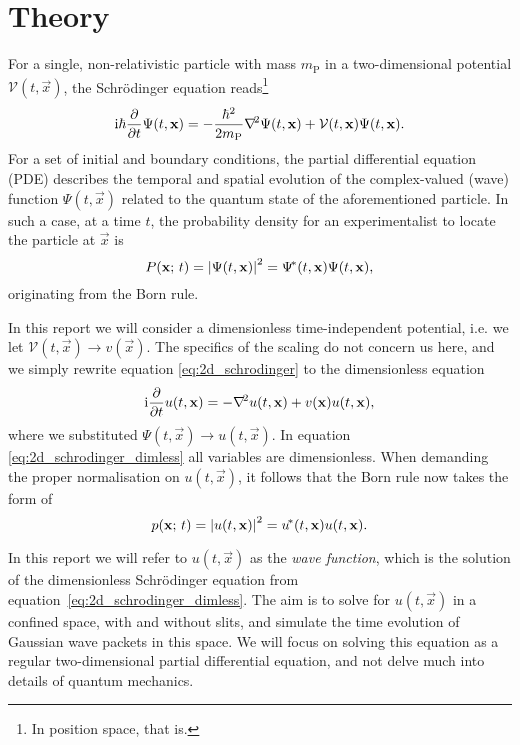 
\section{Theory}\label{sec:theory}
    For a single, non-relativistic particle with mass $m_\mathrm{P}$ in a two-dimensional potential $\mathcal{V}(t, \vec{x})$, the Schrödinger equation reads\footnote{In position space, that is.}
    \begin{equation}\label{eq:2d_schrodinger}
        \mathrm{i} \hbar \pdv{}{t}\Psi(t, \mathbf{x}) = -\frac{\hbar^2}{2m_\mathrm{P}}\nabla^{\!2} \Psi(t, \mathbf{x})  + \mathcal{V}(t, \mathbf{x}) \Psi(t, \mathbf{x}).
    \end{equation}
    For a set of initial and boundary conditions, the partial differential equation (PDE) describes the temporal and spatial evolution of the complex-valued (wave) function $\Psi(t, \vec{x})$ related to the quantum state of the aforementioned particle. In such a case, at a time $t$, the probability density for an experimentalist to locate the particle at $\vec{x}$ is
    \begin{equation}\label{eq:2d_bornrule}
        P(\mathbf{x}; \, t) = \abs{\Psi(t, \mathbf{x})}^2 = \Psi^{\!*}(t, \mathbf{x}) \Psi(t, \mathbf{x}),
    \end{equation} 
    originating from the Born rule.

    In this report we will consider a dimensionless time-independent potential, i.e. we let $\mathcal{V}(t, \vec{x}) \to v(\vec{x})$. The specifics of the scaling do not concern us here, and we simply rewrite equation \eqref{eq:2d_schrodinger} to the dimensionless equation
    \begin{equation}\label{eq:2d_schrodinger_dimless}
        \mathrm{i} \pdv{}{t}u(t, \mathbf{x}) = - \nabla^{\!2}u(t, \mathbf{x})+ v(\mathbf{x})u(t, \mathbf{x}),
    \end{equation}
    where we substituted $\Psi(t, \vec{x}) \to u(t, \vec{x})$. In equation \eqref{eq:2d_schrodinger_dimless} all variables are dimensionless. When demanding the proper normalisation on $u(t,\vec{x})$, it follows that the Born rule now takes the form of
    \begin{equation}\label{eq:2d_bornrule_dimless}
        p(\mathbf{x}; \, t) = \abs{u(t, \mathbf{x})}^2 = u^{\!*} (t, \mathbf{x})u(t, \mathbf{x}).
    \end{equation}

    In this report we will refer to $u(t, \vec{x})$ as the \textit{wave function}, which is the solution of the dimensionless Schrödinger equation from equation~\eqref{eq:2d_schrodinger_dimless}. The aim is to solve for $u(t,\vec{x})$ in a confined space, with and without slits, and simulate the time evolution of Gaussian wave packets in this space. We will focus on solving this equation as a regular two-dimensional partial differential equation, and not delve much into details of quantum mechanics.
